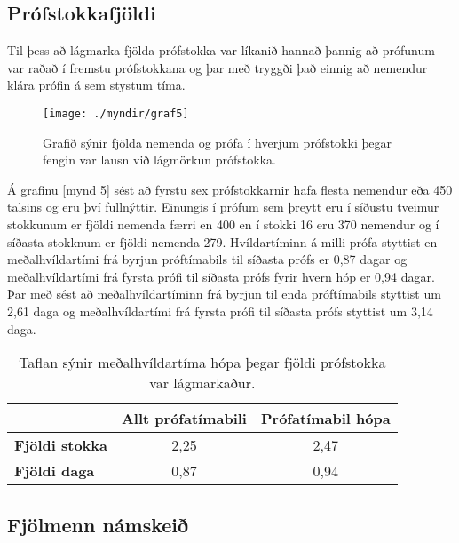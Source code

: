 \documentclass[12pt]{article}
\begin{document}
\subsection{Prófstokkafjöldi}

Til þess að lágmarka fjölda prófstokka var líkanið hannað þannig að prófunum var raðað í fremstu prófstokkana og þar með tryggði það einnig að nemendur klára prófin á sem stystum tíma. 

\begin{figure}[h]
    \centering
    \texttt{[image: ./myndir/graf5]}
    \caption{Grafið sýnir fjölda nemenda og prófa í hverjum prófstokki þegar fengin var lausn við lágmörkun prófstokka.}
\end{figure}

\newpage

Á grafinu [mynd 5] sést að fyrstu sex prófstokkarnir hafa flesta nemendur eða 450 talsins og eru því fullnýttir. Einungis í prófum sem þreytt eru í síðustu tveimur stokkunum er fjöldi nemenda færri en 400 en í stokki 16 eru 370 nemendur og í síðasta stokknum er fjöldi nemenda 279.
Hvíldartíminn á milli prófa styttist en meðalhvíldartími frá byrjun próftímabils til síðasta prófs er 0,87 dagar og meðalhvíldartími frá fyrsta prófi til síðasta prófs fyrir hvern hóp er 0,94 dagar. Þar með sést að meðalhvíldartíminn frá byrjun til enda próftímabils styttist um 2,61 daga og meðalhvíldartími frá fyrsta prófi til síðasta prófs styttist um 3,14 daga. 


\begin{table}[h]
    \centering
    \begin{tabular}{l|c|c|}
        \cline{2-3}
        & \multicolumn{1}{l|}{\textbf{Allt prófatímabili}} & \multicolumn{1}{l|}{\textbf{Prófatímabil hópa}} \\ \hline
        \multicolumn{1}{|l|}{\textbf{Fjöldi stokka}} & 2,25                                             & 2,47                                            \\ \hline
        \multicolumn{1}{|l|}{\textbf{Fjöldi daga}}   & 0,87                                             & 0,94                                            \\ \hline
    \end{tabular}
    \caption{Taflan sýnir meðalhvíldartíma hópa þegar fjöldi  prófstokka var lágmarkaður.}
\end{table}

\subsection{Fjölmenn námskeið}
\end{document}
